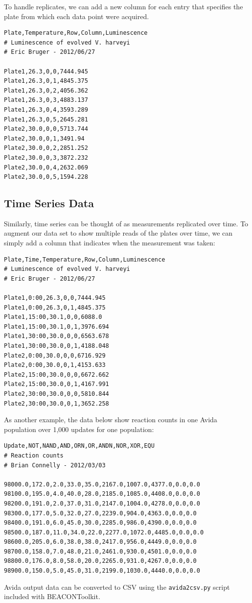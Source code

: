 To handle replicates, we can add a new column for each entry that
specifies the plate from which each data point were acquired.

\begin{lstlisting}
Plate,Temperature,Row,Column,Luminescence
# Luminescence of evolved V. harveyi
# Eric Bruger - 2012/06/27

Plate1,26.3,0,0,7444.945
Plate1,26.3,0,1,4845.375
Plate1,26.3,0,2,4056.362
Plate1,26.3,0,3,4883.137
Plate1,26.3,0,4,3593.289
Plate1,26.3,0,5,2645.281
Plate2,30.0,0,0,5713.744
Plate2,30.0,0,1,3491.94
Plate2,30.0,0,2,2851.252
Plate2,30.0,0,3,3872.232
Plate2,30.0,0,4,2632.069
Plate2,30.0,0,5,1594.228
\end{lstlisting}
\subsection{Time Series Data}

Similarly, time series can be thought of as measurements replicated over
time. To augment our data set to show multiple reads of the plates over
time, we can simply add a column that indicates when the measurement was
taken:

\begin{lstlisting}
Plate,Time,Temperature,Row,Column,Luminescence
# Luminescence of evolved V. harveyi
# Eric Bruger - 2012/06/27

Plate1,0:00,26.3,0,0,7444.945
Plate1,0:00,26.3,0,1,4845.375
Plate1,15:00,30.1,0,0,6088.0
Plate1,15:00,30.1,0,1,3976.694
Plate1,30:00,30.0,0,0,6563.678
Plate1,30:00,30.0,0,1,4188.048
Plate2,0:00,30.0,0,0,6716.929
Plate2,0:00,30.0,0,1,4153.633
Plate2,15:00,30.0,0,0,6672.662
Plate2,15:00,30.0,0,1,4167.991
Plate2,30:00,30.0,0,0,5810.844
Plate2,30:00,30.0,0,1,3652.258
\end{lstlisting}
As another example, the data below show reaction counts in one Avida
population over 1,000 updates for one population:

\begin{lstlisting}
Update,NOT,NAND,AND,ORN,OR,ANDN,NOR,XOR,EQU
# Reaction counts
# Brian Connelly - 2012/03/03

98000.0,172.0,2.0,33.0,35.0,2167.0,1007.0,4377.0,0.0,0.0
98100.0,195.0,4.0,40.0,28.0,2185.0,1085.0,4408.0,0.0,0.0
98200.0,191.0,2.0,37.0,31.0,2147.0,1004.0,4278.0,0.0,0.0
98300.0,177.0,5.0,32.0,27.0,2239.0,904.0,4363.0,0.0,0.0
98400.0,191.0,6.0,45.0,30.0,2285.0,986.0,4390.0,0.0,0.0
98500.0,187.0,11.0,34.0,22.0,2277.0,1072.0,4485.0,0.0,0.0
98600.0,205.0,6.0,38.0,38.0,2417.0,956.0,4449.0,0.0,0.0
98700.0,158.0,7.0,48.0,21.0,2461.0,930.0,4501.0,0.0,0.0
98800.0,176.0,8.0,58.0,20.0,2265.0,931.0,4267.0,0.0,0.0
98900.0,150.0,5.0,45.0,31.0,2199.0,1030.0,4440.0,0.0,0.0
\end{lstlisting}
Avida output data can be converted to CSV using the
\lstinline!avida2csv.py! script included with BEACONToolkit.

